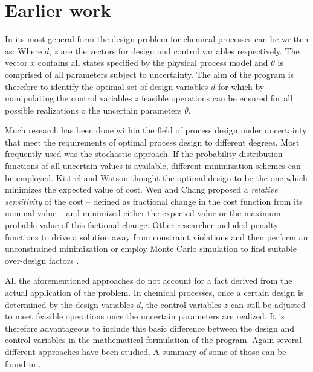 \section{Earlier work}
\label{sec:des:EarlierWork}
In its most general form the design problem for chemical processes can be written as:
Where $d$, $z$ are the vectors for design and control variables respectively. The vector $x$ contains
all states specified by the physical process model and $\theta$ is comprised of all parameters subject
to uncertainty. The aim of the program is therefore to identify the optimal set of design variables $d$
for which by manipulating the control variables $z$ feasible operations can be ensured for all possible 
realizations o the uncertain parameters $\theta$. 

Much research has been done within the field of process design under uncertainty that meet the 
requirements of optimal process design to different degrees. Most frequently used was the stochastic 
approach. If the probability distribution functions of all uncertain values is available, different minimization 
schemes can be employed. Kittrel and Watson \cite{} 
thought the optimal design to be the one which minimizes the expected value of cost. Wen and Chang 
\cite{}  proposed a \emph{relative sensitivity} of the cost -- 
defined as fractional change in the cost function from its nominal value -- and minimized either the expected 
value or the maximum probable value of this factional change. Other researcher included penalty functions 
to drive a solution away from constraint violations and then perform an unconstrained minimization or 
employ Monte Carlo simulation to find suitable over-design factors \cite{} . 

All the aforementioned approaches do not account for a fact derived from the actual application of the 
problem. In chemical processes, once a certain design is determined by the design variables $d$, the 
control variables $z$ can still be adjusted to meet feasible operations once the uncertain parameters 
are realized. It is therefore advantageous to include this basic difference between the design and 
control variables in the mathematical formulation of the program. Again several different  approaches 
have been studied. A summary of some of those can be found in \cite{}.

